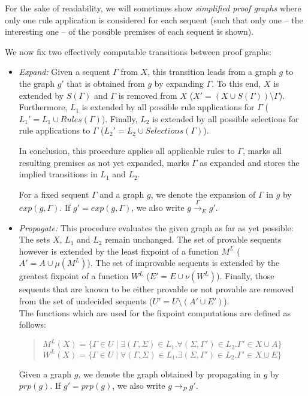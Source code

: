 \documentclass{llncs}
\begin{document}
For the sake of readability, we will sometimes show \emph{simplified proof graphs} where only one rule application
is considered for each sequent (such that only one -- the interesting one -- of the possible premises of each sequent is shown).

We now fix two effectively computable transitions between proof graphs:

\begin{itemize}
\item \emph{Expand:} Given a sequent $\Gamma$ from $X$, this transition leads from a graph
$g$ to the graph $g'$ that is
obtained from $g$ by expanding $\Gamma$. To this end, $X$ is extended by $S(\Gamma)$ and
$\Gamma$ is removed from $X$ ($X'=(X\cup S(\Gamma))\setminus \Gamma$).
Furthermore, $L_1$ is extended by all possible rule applications for $\Gamma$
($L_1'=L_1 \cup Rules(\Gamma)$). Finally, $L_2$ is extended by all possible selections
for rule applications to $\Gamma$ ($L_2'=L_2\cup Selections(\Gamma)$).

In conclusion, this procedure applies all applicable rules to $\Gamma$, marks all resulting 
premises as not yet expanded, marks $\Gamma$ as expanded and stores the implied transitions in
$L_1$ and $L_2$.

For a fixed sequent $\Gamma$ and a graph $g$, we denote the expansion of $\Gamma$ in $g$ by
$exp(g,\Gamma)$. If $g'=exp(g,\Gamma)$, we also write $g\stackrel{\Gamma}\rightarrow_E g'$.

\item \emph{Propagate:} This procedure evaluates the given graph as far as yet possible: The sets
$X$, $L_1$ and $L_2$ remain unchanged. The set of provable sequents however is extended by the least
fixpoint of a function $M^L$ ($A'=A\cup\mu(M^L)$). The set of improvable sequents is extended by the
greatest fixpoint of a function $W^L$ ($E'=E\cup\nu(W^L)$). Finally, those sequents that are known to be
either provable or not provable are removed from the set of undecided sequents
($U'=U\setminus(A'\cup E')$).\\

The functions which are used for the fixpoint computations are defined as follows:\\

\begin{quote}
$M^L(X)=\{\Gamma\in U\mid\exists(\Gamma,\Sigma)\in L_1.\forall (\Sigma,\Gamma')\in L_2. \Gamma'\in X\cup A\}$\\
$W^L(X)=\{\Gamma\in U\mid\forall(\Gamma,\Sigma)\in L_1.\exists (\Sigma,\Gamma')\in L_2. \Gamma'\in X\cup E\}$\\
\end{quote}

Given a graph $g$, we denote the graph obtained by propagating in $g$ by
$prp(g)$. If $g'=prp(g)$, we also write $g\rightarrow_P g'$.

\end{itemize}
\end{document}
